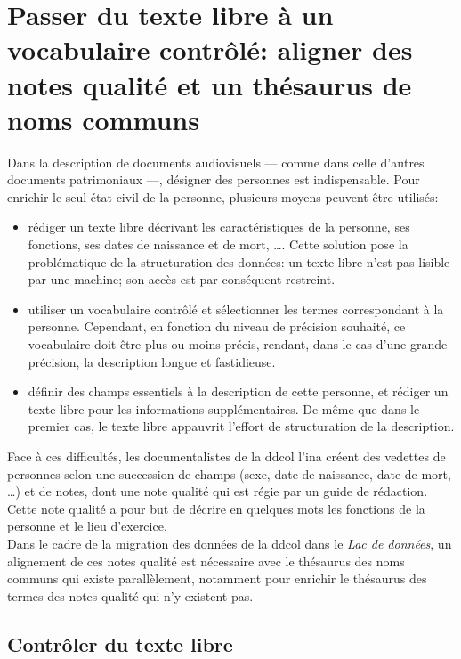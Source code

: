 \section{\label{I-C-3}Passer du texte libre à un vocabulaire contrôlé: aligner des notes qualité et un thésaurus de noms communs}

Dans la description de documents audiovisuels --- comme dans celle d'autres documents patrimoniaux ---, désigner des personnes est indispensable. Pour enrichir le seul état civil de la personne, plusieurs moyens peuvent être utilisés:
\begin{itemize}
	\item rédiger un texte libre décrivant les caractéristiques de la personne, ses fonctions, ses dates de naissance et de mort, \dots. Cette solution pose la problématique de la structuration des données: un texte libre n'est pas lisible par une machine; son accès est par conséquent restreint.
	\item utiliser un vocabulaire contrôlé et sélectionner les termes correspondant à la personne. Cependant, en fonction du niveau de précision souhaité, ce vocabulaire doit être plus ou moins précis, rendant, dans le cas d'une grande précision, la description longue et fastidieuse.
	\item définir des champs essentiels à la description de cette personne, et rédiger un texte libre pour les informations supplémentaires. De même que dans le premier cas, le texte libre appauvrit l'effort de structuration de la description.
\end{itemize}
Face à ces difficultés, les documentalistes de la \ac{ddcol} l'\ac{ina} créent des vedettes de personnes selon une succession de champs (sexe, date de naissance, date de mort, \dots) et de notes, dont une note qualité qui est régie par un guide de rédaction. Cette note qualité a pour but de décrire en quelques mots les fonctions de la personne et le lieu d'exercice.\\

Dans le cadre de la migration des données de la \ac{ddcol} dans le \textit{Lac de données}, un alignement de ces notes qualité est nécessaire avec le thésaurus des noms communs qui existe parallèlement, notamment pour enrichir le thésaurus des termes des notes qualité qui n'y existent pas.

\subsection{\label{I-C-3-a}Contrôler du texte libre}

